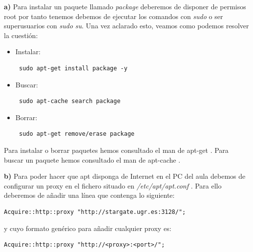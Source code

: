 \textbf{a)} Para instalar un paquete llamado \textit{package} deberemos de disponer de permisos root por tanto tenemos debemos de ejecutar los comandos con \textit{sudo} o ser superusuarios con \textit{sudo su}. Una vez aclarado esto, veamos como podemos resolver la cuestión:
\begin{itemize}
	\item Instalar: \begin{verbatim} sudo apt-get install package -y\end{verbatim}
	\item Buscar: \begin{verbatim} sudo apt-cache search package\end{verbatim}
	\item Borrar: \begin{verbatim} sudo apt-get remove/erase package\end{verbatim}
\end{itemize}

Para instalar o borrar paquetes hemos consultado el man de apt-get \cite{apt-get}. Para buscar un paquete hemos consultado el man de apt-cache \cite{apt-cache}.

\vspace{9mm}

\textbf{b) } Para poder hacer que apt disponga de Internet en el PC del aula debemos de configurar un proxy en el fichero situado en \textit{/etc/apt/apt.conf} \cite{apt-proxy-conf}. Para ello deberemos de añadir una línea que contenga lo siguiente:\begin{verbatim}Acquire::http::proxy "http://stargate.ugr.es:3128/";\end{verbatim} y cuyo formato genérico para añadir cualquier proxy es: \begin{verbatim}Acquire::http::proxy "http://<proxy>:<port>/";\end{verbatim}

\vspace{9mm}

